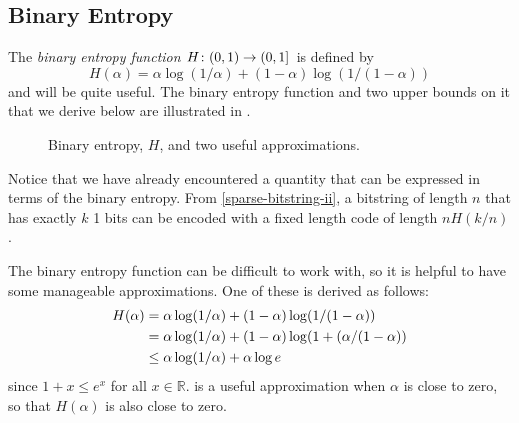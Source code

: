 \documentclass{patmorin}
\begin{document}
\subsection{Binary Entropy}

The \emph{binary entropy function} $H\colon (0,1)\to(0,1]$ is defined by
\[
    H(\alpha) = \alpha\log(1/\alpha) + (1-\alpha)\log(1/(1-\alpha)) 
\]
and will be quite useful.  The binary entropy function and two upper
bounds on it that we derive below are illustrated in .

\begin{figure}
  \caption{Binary entropy, $H$, and two useful approximations.}
\end{figure}

Notice that we have already encountered a quantity that can be expressed
in terms of the binary entropy.  From \eqref{sparse-bitstring-ii},
a bitstring of length $n$ that has exactly $k$ 1 bits can be encoded
with a fixed length code of length $nH(k/n)$.

The binary entropy function can be difficult to work with, so it is
helpful to have some manageable approximations.  One of these is derived
as follows:
\begin{align}
  H(\alpha) & = \alpha\log(1/\alpha) + (1-\alpha)\log(1/(1-\alpha)) \notag \\
       & = \alpha\log(1/\alpha) + (1-\alpha)\log(1+(\alpha/(1-\alpha)) \notag \\
       & \le \alpha\log(1/\alpha) + \alpha\log e \eqlabel{entropy-i} 
\end{align}
since $1+x\le e^x$ for all $x\in\mathbb{R}$.  is a
useful approximation when $\alpha$ is close to zero, so that $H(\alpha)$ is also
close to zero.
\end{document}
